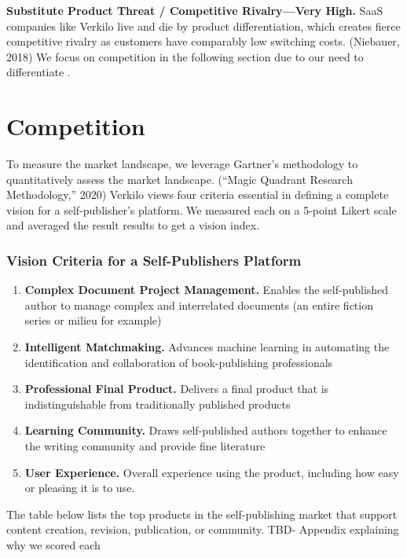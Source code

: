 \documentclass[10pt,openany]{book}
\providecommand{\tightlist}{%
  \setlength{\itemsep}{0pt}\setlength{\parskip}{0pt}}
\begin{document}
\textbf{Substitute Product Threat / Competitive Rivalry---Very High.}
SaaS companies like Verkilo live and die by product differentiation,
which creates fierce competitive rivalry as customers have comparably
low switching costs. (Niebauer, 2018) We focus on competition in the
following section due to our need to differentiate .

\hypertarget{competition}{%
\section{Competition}\label{competition}}

To measure the market landscape, we leverage Gartner's methodology to
quantitatively assess the market landscape. (``Magic Quadrant Research
Methodology,'' 2020) Verkilo views four criteria essential in defining a
complete vision for a self-publisher's platform. We measured each on a
5-point Likert scale and averaged the result results to get a vision
index.

\hypertarget{vision-criteria-for-a-self-publishers-platform}{%
\subsubsection{Vision Criteria for a Self-Publishers
Platform}\label{vision-criteria-for-a-self-publishers-platform}}

\begin{enumerate}
\def\labelenumi{\arabic{enumi}.}
\tightlist
\item
  \textbf{Complex Document Project Management.} Enables the
  self-published author to manage complex and interrelated documents (an
  entire fiction series or milieu for example)
\item
  \textbf{Intelligent Matchmaking.} Advances machine learning in
  automating the identification and collaboration of book-publishing
  professionals
\item
  \textbf{Professional Final Product.} Delivers a final product that is
  indistinguishable from traditionally published products
\item
  \textbf{Learning Community.} Draws self-published authors together to
  enhance the writing community and provide fine literature
\item
  \textbf{User Experience.} Overall experience using the product,
  including how easy or pleasing it is to use.
\end{enumerate}

The table below lists the top products in the self-publishing market
that support content creation, revision, publication, or community. TBD-
Appendix explaining why we scored each
\end{document}
